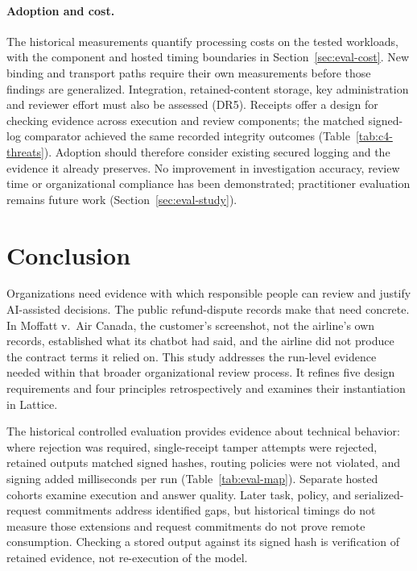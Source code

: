 \documentclass[11pt]{article}
\begin{document}
\paragraph{Adoption and cost.} The historical measurements quantify processing costs on the tested workloads, with the component and hosted timing boundaries in Section~\ref{sec:eval-cost}. New binding and transport paths require their own measurements before those findings are generalized. Integration, retained-content storage, key administration and reviewer effort must also be assessed (DR5). Receipts offer a design for checking evidence across execution and review components; the matched signed-log comparator achieved the same recorded integrity outcomes (Table~\ref{tab:c4-threats}). Adoption should therefore consider existing secured logging and the evidence it already preserves. No improvement in investigation accuracy, review time or organizational compliance has been demonstrated; practitioner evaluation remains future work (Section~\ref{sec:eval-study}).

\FloatBarrier

\section{Conclusion}\label{sec:conclusion}

Organizations need evidence with which responsible people can review and justify AI-assisted decisions. The public refund-dispute records make that need concrete. In Moffatt v.\ Air Canada, the customer's screenshot, not the airline's own records, established what its chatbot had said, and the airline did not produce the contract terms it relied on. This study addresses the run-level evidence needed within that broader organizational review process. It refines five design requirements and four principles retrospectively and examines their instantiation in Lattice.

The historical controlled evaluation provides evidence about technical behavior: where rejection was required, single-receipt tamper attempts were rejected, retained outputs matched signed hashes, routing policies were not violated, and signing added milliseconds per run (Table~\ref{tab:eval-map}). Separate hosted cohorts examine execution and answer quality. Later task, policy, and serialized-request commitments address identified gaps, but historical timings do not measure those extensions and request commitments do not prove remote consumption. Checking a stored output against its signed hash is verification of retained evidence, not re-execution of the model.
\end{document}
